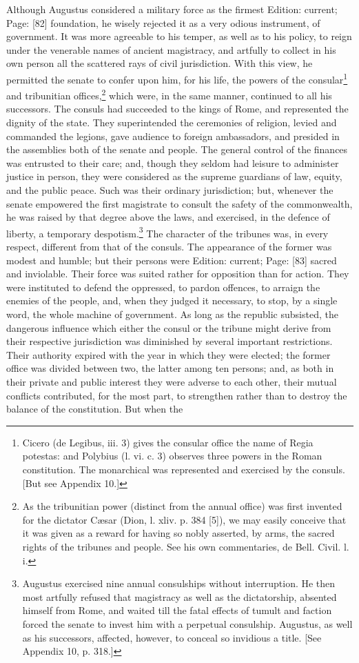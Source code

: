 Although Augustus considered a military force as the firmest Edition: current; Page: [82] foundation, he wisely rejected it as a very odious instrument, of government. It was more agreeable to his temper, as well as to his policy, to reign under the venerable names of ancient magistracy, and artfully to collect in his own person all the scattered rays of civil jurisdiction. With this view, he permitted the senate to confer upon him, for his life, the powers of the consular\footnote{Cicero (de Legibus, iii. 3) gives the consular office the name of Regia potestas: and Polybius (l. vi. c. 3) observes three powers in the Roman constitution. The monarchical was represented and exercised by the consuls. [But see Appendix 10.]} and tribunitian offices,\footnote{As the tribunitian power (distinct from the annual office) was first invented for the dictator Cæsar (Dion, l. xliv. p. 384 [5]), we may easily conceive that it was given as a reward for having so nobly asserted, by arms, the sacred rights of the tribunes and people. See his own commentaries, de Bell. Civil. l. i.} which were, in the same manner, continued to all his successors. The consuls had succeeded to the kings of Rome, and represented the dignity of the state. They superintended the ceremonies of religion, levied and commanded the legions, gave audience to foreign ambassadors, and presided in the assemblies both of the senate and people. The general control of the finances was entrusted to their care; and, though they seldom had leisure to administer justice in person, they were considered as the supreme guardians of law, equity, and the public peace. Such was their ordinary jurisdiction; but, whenever the senate empowered the first magistrate to consult the safety of the commonwealth, he was raised by that degree above the laws, and exercised, in the defence of liberty, a temporary despotism.\footnote{Augustus exercised nine annual consulships without interruption. He then most artfully refused that magistracy as well as the dictatorship, absented himself from Rome, and waited till the fatal effects of tumult and faction forced the senate to invest him with a perpetual consulship. Augustus, as well as his successors, affected, however, to conceal so invidious a title. [See Appendix 10, p. 318.]} The character of the tribunes was, in every respect, different from that of the consuls. The appearance of the former was modest and humble; but their persons were Edition: current; Page: [83] sacred and inviolable. Their force was suited rather for opposition than for action. They were instituted to defend the oppressed, to pardon offences, to arraign the enemies of the people, and, when they judged it necessary, to stop, by a single word, the whole machine of government. As long as the republic subsisted, the dangerous influence which either the consul or the tribune might derive from their respective jurisdiction was diminished by several important restrictions. Their authority expired with the year in which they were elected; the former office was divided between two, the latter among ten persons; and, as both in their private and public interest they were adverse to each other, their mutual conflicts contributed, for the most part, to strengthen rather than to destroy the balance of the constitution. But when the 